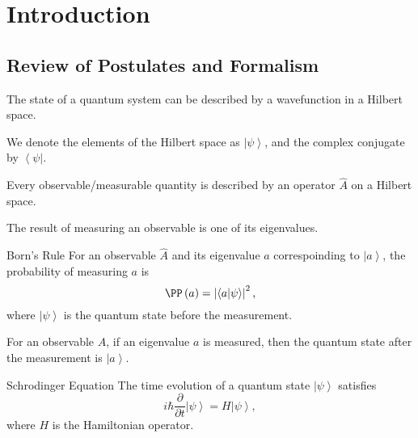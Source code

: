 \documentclass[phys334]{subfiles}
\begin{document}
    \section{Introduction}

    \subsection{Review of Postulates and Formalism}

    \begin{postulate}{}
        The state of a quantum system can be described by a wavefunction in a Hilbert space.
    \end{postulate}

    \np
    We denote the elements of the Hilbert space as $\left| \psi \right\rangle$, and the complex conjugate by $\left\langle \psi \right|$.

    \begin{postulate}{}
        Every observable/measurable quantity is described by an operator $\hat{A}$ on a Hilbert space.
    \end{postulate}

    \begin{postulate}{}
        The result of measuring an observable is one of its eigenvalues.
    \end{postulate}

    \begin{postulate}{Born's Rule}
        For an observable $\hat{A}$ and its eigenvalue $a$ correspoinding to $\left| a \right\rangle$, the probability of measuring $a$ is
        \begin{equation*}
            \PP\left( a \right) = \left| \left\langle a | \psi \right\rangle \right|^{2},
        \end{equation*}
        where $\left| \psi \right\rangle$ is the quantum state before the measurement.
    \end{postulate}

    \begin{postulate}{}
        For an observable $\hat{A}$, if an eigenvalue $a$ is measured, then the quantum state after the measurement is $\left| a \right\rangle$.
    \end{postulate}

    \begin{postulate}{Schrodinger Equation}
        The time evolution of a quantum state $\left| \psi \right\rangle$ satisfies
        \begin{equation*}
            i\hbar \frac{\partial}{\partial t} \left| \psi \right\rangle = H\left| \psi \right\rangle,
        \end{equation*}
        where $H$ is the Hamiltonian operator.
    \end{postulate}
\end{document}
